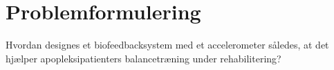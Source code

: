 \section{Problemformulering}
Hvordan designes et biofeedbacksystem med et accelerometer således, at det hjælper apopleksipatienters balancetræning under rehabilitering?


